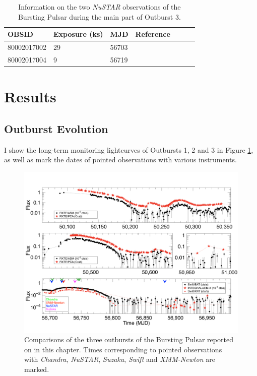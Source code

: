 \begin{table}
\centering
\begin{tabular}{lllllll}
\hline
\hline
\scriptsize  OBSID &\scriptsize Exposure (ks) &\scriptsize MJD &\scriptsize Reference \\
\hline
80002017002 	& 29 & 56703 &  \citet{Dai_Hlags}  \\
80002017004 	& 9 & 56719 & \citet{Younes_Expo}\\
\hline
\hline
\end{tabular}
\caption[Information on two \textit{NuSTAR} observations of the Bursting Pulsar during its 2014 outburst.]{Information on the two \indexnustar\textit{NuSTAR} observations of the Bursting Pulsar during the main part of Outburst 3.}
\label{tab:NuS}
\end{table}

\section{Results}
\label{sec:Results}

\subsection{Outburst Evolution}

\par I show the long-term monitoring lightcurves of Outbursts 1, 2 and 3 in Figure \ref{fig:global_ob}, as well as mark the dates of pointed observations with various instruments.

\begin{figure}
  \centering
  \includegraphics[width=.9\linewidth, trim={0cm 0 0cm 0},clip]{images/lc_comp.pdf}
  \caption[Comparisons of three outbursts of the Bursting Pulsar.]{\small \indexbat\indexxrt\indexrxte\indexasm\indexpca\indexintegral\indexjemx Comparisons of the three outbursts of the Bursting Pulsar reported on in this chapter.  Times corresponding to pointed observations with \indexchandra\textit{Chandra}, \indexnustar\textit{NuSTAR}, \indexsuzaku\textit{Suzaku}, \indexswift\textit{Swift} and \indexxmm\textit{XMM-Newton} are marked.}
  \label{fig:global_ob}
\end{figure}

